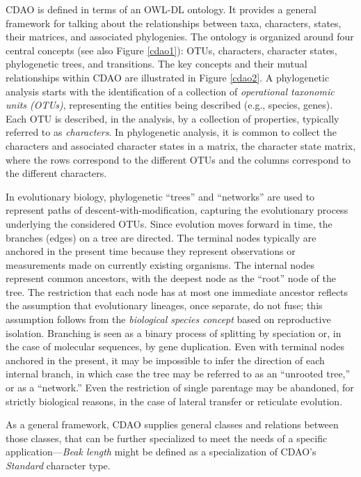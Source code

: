 \documentclass[10pt]{bmc_article}
\newenvironment{bmcformat}{\fussy\setboolean{publ}{true}}{\fussy}
\begin{document}
\begin{bmcformat}
  CDAO is defined in terms of an OWL-DL ontology. It provides a general framework
  for talking about the relationships between taxa, characters, states, their matrices, and associated 
  phylogenies.   The ontology is organized around four central concepts (see also
	Figure \ref{cdao1}): OTUs, characters, character states, phylogenetic trees, and
transitions. The key concepts and their mutual relationships
within CDAO are illustrated in Figure \ref{cdao2}.
A phylogenetic analysis starts with the identification of a
collection of \emph{operational taxonomic units (OTUs)}, representing
the entities being described (e.g., species, genes). Each OTU is
described, in the analysis, by a collection of properties, typically
referred to as \emph{characters}. In phylogenetic analysis,
it is common to collect the characters and associated character states in a matrix, the
character state matrix, where the rows correspond to the different
OTUs and the columns correspond to the different characters.
  
In evolutionary biology, phylogenetic ``trees'' and ``networks'' are
used to represent paths of descent-with-modification, capturing the
evolutionary process underlying the considered OTUs. Since evolution moves
forward in time, the branches (edges) on a tree are directed. The
terminal nodes typically are anchored in the present time because
they represent observations or measurements made on currently
existing organisms. The internal nodes represent common
ancestors, with the deepest node as the ``root'' node of the tree.
The restriction that each node has at most one immediate ancestor
reflects the assumption that evolutionary lineages, once separate,
do not fuse; this assumption follows from the \emph{biological species
concept} based on reproductive isolation. Branching is seen as a
binary process of splitting by speciation or, in the case of
molecular sequences, by gene duplication. 
Even with terminal nodes anchored in the present, it may be
impossible to infer the direction of each internal branch, in which
case the tree may be referred to as an ``unrooted tree,'' or as a
``network.'' Even the restriction of single parentage may be
abandoned, for strictly biological reasons, in the case of lateral
transfer or reticulate evolution. 
  
  As a general framework, CDAO supplies general classes and relations between those classes, 
  that can be further specialized to meet the needs of a specific application---\emph{Beak length}
   might be defined as a specialization of CDAO's \textit{Standard} 
  character type.
   


\end{bmcformat}
\end{document}
